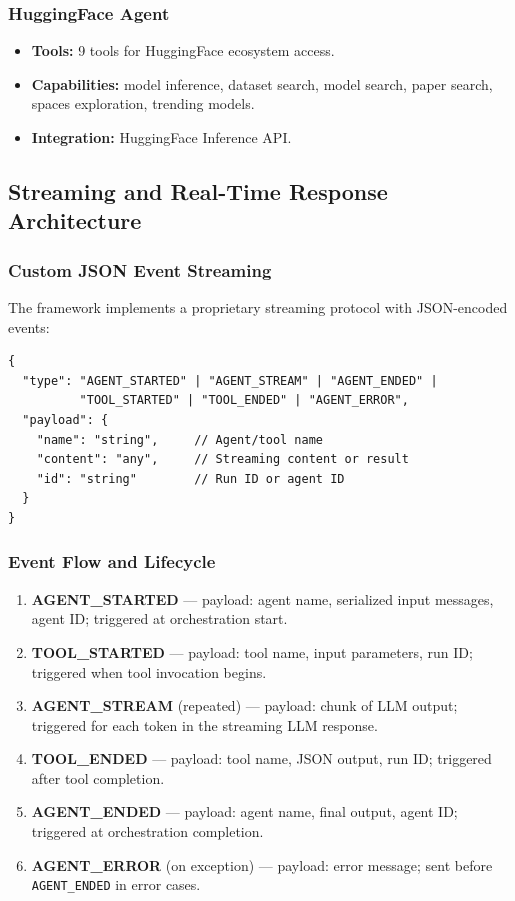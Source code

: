\documentclass[11pt,a4paper]{report}
\newcommand{\code}[1]{\texttt{\small #1}}
\begin{document}
\subsubsection{HuggingFace Agent}
\begin{itemize}
  \item \textbf{Tools:} 9 tools for HuggingFace ecosystem access.
  \item \textbf{Capabilities:} model inference, dataset search, model search, paper search, spaces exploration, trending models.
  \item \textbf{Integration:} HuggingFace Inference API.
\end{itemize}

\subsection{Streaming and Real-Time Response Architecture}

\subsubsection{Custom JSON Event Streaming}

The framework implements a proprietary streaming protocol with JSON-encoded events:

\begin{lstlisting}[style=jsonstyle,caption={Streaming event structure.}]
{
  "type": "AGENT_STARTED" | "AGENT_STREAM" | "AGENT_ENDED" |
          "TOOL_STARTED" | "TOOL_ENDED" | "AGENT_ERROR",
  "payload": {
    "name": "string",     // Agent/tool name
    "content": "any",     // Streaming content or result
    "id": "string"        // Run ID or agent ID
  }
}
\end{lstlisting}

\subsubsection{Event Flow and Lifecycle}

\begin{enumerate}
  \item \textbf{AGENT\_STARTED} --- payload: agent name, serialized input messages, agent ID; triggered at orchestration start.
  \item \textbf{TOOL\_STARTED} --- payload: tool name, input parameters, run ID; triggered when tool invocation begins.
  \item \textbf{AGENT\_STREAM} (repeated) --- payload: chunk of LLM output; triggered for each token in the streaming LLM response.
  \item \textbf{TOOL\_ENDED} --- payload: tool name, JSON output, run ID; triggered after tool completion.
  \item \textbf{AGENT\_ENDED} --- payload: agent name, final output, agent ID; triggered at orchestration completion.
  \item \textbf{AGENT\_ERROR} (on exception) --- payload: error message; sent before \code{AGENT\_ENDED} in error cases.
\end{enumerate}
\end{document}
